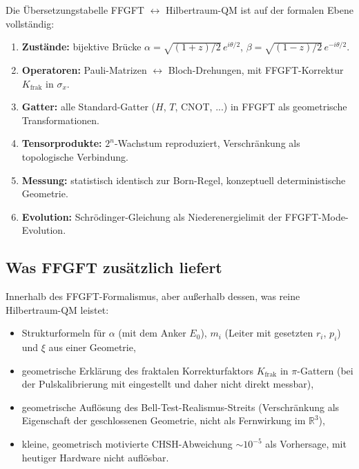 Die Übersetzungstabelle FFGFT $\leftrightarrow$ Hilbertraum-QM ist
auf der formalen Ebene vollständig:

\begin{enumerate}[leftmargin=2em,itemsep=2pt,topsep=2pt]
  \item \textbf{Zustände:} bijektive Brücke
        $\alpha = \sqrt{(1+z)/2}\,e^{i\theta/2}$,
        $\beta = \sqrt{(1-z)/2}\,e^{-i\theta/2}$.
  \item \textbf{Operatoren:} Pauli-Matrizen $\leftrightarrow$
        Bloch-Drehungen, mit FFGFT-Korrektur $K_{\text{frak}}$ in
        $\sigma_x$.
  \item \textbf{Gatter:} alle Standard-Gatter ($H$, $T$, CNOT, ...)
        in FFGFT als geometrische Transformationen.
  \item \textbf{Tensorprodukte:} $2^n$-Wachstum reproduziert,
        Verschränkung als topologische Verbindung.
  \item \textbf{Messung:} statistisch identisch zur Born-Regel,
        konzeptuell deterministische Geometrie.
  \item \textbf{Evolution:} Schrödinger-Gleichung als
        Niederenergielimit der FFGFT-Mode-Evolution.
\end{enumerate}

\subsection*{Was FFGFT zusätzlich liefert}

Innerhalb des FFGFT-Formalismus, aber außerhalb dessen, was reine
Hilbertraum-QM leistet:

\begin{itemize}[leftmargin=2em,itemsep=2pt,topsep=2pt]
  \item Strukturformeln für $\alpha$ (mit dem Anker $E_0$),
        $m_i$ (Leiter mit gesetzten $r_i$, $p_i$) und $\xi$ aus
        einer Geometrie,
  \item geometrische Erklärung des fraktalen Korrekturfaktors
        $K_{\text{frak}}$ in $\pi$-Gattern (bei der Pulskalibrierung mit eingestellt und daher nicht direkt messbar),
  \item geometrische Auflösung des Bell-Test-Realismus-Streits
        (Verschränkung als Eigenschaft der geschlossenen Geometrie, nicht als
        Fernwirkung im $\mathbb{R}^3$),
  \item kleine, geometrisch motivierte CHSH-Abweichung
        $\sim 10^{-5}$ als Vorhersage, mit heutiger Hardware nicht auflösbar.
\end{itemize}

